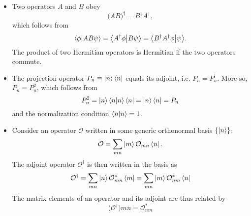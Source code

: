 \documentclass[11pt, a4paper]{article}
\newcommand{\Herm}{Hermitian\xspace}
\renewcommand{\O}{\mathcal{O}}  %
\newcommand{\p}{\psi}  %
\newcommand{\bbraket}[2]{\big \langle {#1} \big | {#2} \big \rangle}  %
\begin{document}
\begin{itemize}
	\item Two operators $ A $ and $ B $ obey
	\begin{equation*}
		\big(AB\big)^{\dagger} = B^{\dagger}A^{\dagger},
	\end{equation*}
	which follows from
	\begin{equation*}
		\braket{\phi}{AB\p} = \bbraket{A^{\dagger}\phi}{B\p} = \bbraket{B^{\dagger}A^{\dagger}\phi}{\p}.
	\end{equation*}
	The product of two \Herm operators is \Herm if the two operators commute.
	
	\item The projection operator $ P_{n} \equiv \ket{n}\bra{n} $ equals its adjoint, i.e. $ P_{n} = P_{n}^{\dagger} $. More so, $ P_{n} = P_{n}^{2} $, which follows from
	\begin{equation*}
		P_{n}^{2} = \ket{n}\bra{n} \ket{n}\bra{n} = \ket{n}\bra{n} = P_{n}
	\end{equation*}
	and the normalization condition $ \braket{n}{n} = 1 $.
	
	\item Consider an operator $ \O $ written in some generic orthonormal basis $ \{\ket{n}\} $:
	\begin{equation*}
		\O = \sum_{mn} \ket{m}\O_{mn}\bra{n}.
	\end{equation*}
	The adjoint operator $ \O^{\dagger} $ is then written in the basis as
	\begin{equation*}
		\O^{\dagger} = \sum_{mn}\ket{n}\O_{mn}^{*}\bra{m} = \sum_{mn}\ket{m} \O_{nm}^{*}\bra{n}
	\end{equation*}
	The matrix elements of an operator and its adjoint are thus related by
	\begin{equation*}
		\big(\O^{\dagger}\big)mn = \O_{nm}^{*}
	\end{equation*}
\end{itemize}
\end{document}
